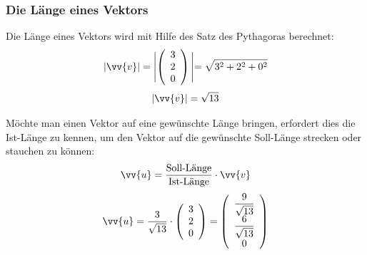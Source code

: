 \documentclass[a4paper, 15pt]{article}
\begin{document}
\subsubsection{Die Länge eines Vektors}
\begin{minipage}{.49\textwidth}
Die Länge eines Vektors wird mit Hilfe des Satz des Pythagoras berechnet:
\begin{equation*}
|\vv{v}| = \Biggl|\left(\begin{array}{c} 3 \\ 2 \\ 0 \end{array}\right)\Biggl| = \sqrt{{3^2}+{2^2}+{0^2}}
\end{equation*}
\begin{equation*}
|\vv{v}| = \sqrt{13}
\end{equation*}
\end{minipage}
\begin{minipage}{.49\textwidth}
\flushright
\begin{center}
\end{center}
\end{minipage}\newline\newline
Möchte man einen Vektor auf eine gewünschte Länge bringen, erfordert dies die Ist-Länge zu kennen, um den Vektor auf die gewünschte Soll-Länge strecken oder stauchen zu können:
\begin{equation*}
\vv{u} = \dfrac{\text{Soll-Länge}}{\text{Ist-Länge}} \cdot \vv{v}
\end{equation*}
\begin{equation*}
\vv{u} = \dfrac{3}{\sqrt{13}} \cdot \left(\begin{array}{c} 3 \\ 2 \\ 0 \end{array}\right) = \left(\begin{array}{c} \dfrac{9}{\sqrt{13}} \\ \dfrac{6}{\sqrt{13}} \\ 0 \end{array}\right)
\end{equation*}
\end{document}
